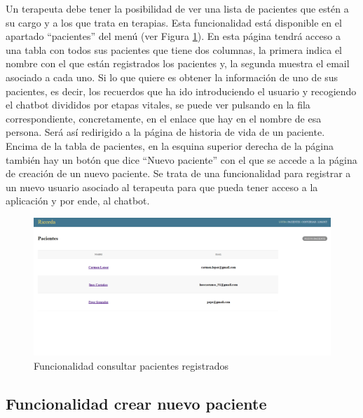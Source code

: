 Un terapeuta debe tener la posibilidad de ver una lista de pacientes que estén a su cargo y a los que trata en terapias. Esta funcionalidad está disponible en el apartado ``pacientes'' del menú (ver Figura \ref{fig:funcionalidadconsultadepacientes}). En esta página tendrá acceso a una tabla con todos sus pacientes que tiene dos columnas, la primera indica el nombre con el que están registrados los pacientes y, la segunda muestra el email asociado a cada uno. Si lo que quiere es obtener la información de uno de sus pacientes, es decir, los recuerdos que ha ido introduciendo el usuario y recogiendo el chatbot divididos por etapas vitales, se puede ver pulsando en la fila correspondiente, concretamente, en el enlace que hay en el nombre de esa persona. Será así redirigido a la página de historia de vida de un paciente. Encima de la tabla de pacientes, en la esquina superior derecha de la página también hay un botón que dice ``Nuevo paciente'' con el que se accede a la página de creación de un nuevo paciente. Se trata de una funcionalidad para registrar a un nuevo usuario asociado al terapeuta para que pueda tener acceso a la aplicación y por ende, al chatbot.

\begin{figure}[h]
	\centering
	\includegraphics[scale=0.3]{Imagenes/Vectorial/funcionalidad_consultar_pacientes}
	\caption{Funcionalidad consultar pacientes registrados}
	\label{fig:funcionalidadconsultadepacientes}
\end{figure}

\subsection{Funcionalidad crear nuevo paciente}

